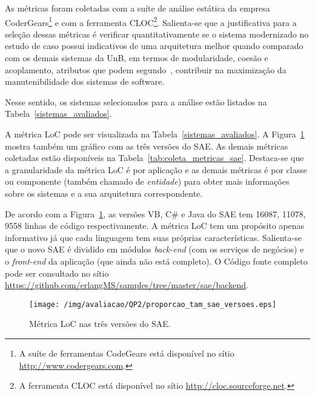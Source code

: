 As métricas foram coletadas com a suíte de análise estática da empresa CoderGears\footnote{A suíte de ferramentas CodeGears está disponível no sítio \url{http://www.codergears.com}.} e com a ferramenta CLOC\footnote{A ferramenta CLOC está disponível no sítio \url{http://cloc.sourceforge.net}.}. Salienta-se que a justificativa para a seleção dessas métricas é verificar quantitativamente se o sistema modernizado no estudo de caso possui indicativos
de uma arquitetura melhor quando comparado com os demais sistemas da UnB, em termos de modularidade, coesão e acoplamento, atributos que podem segundo~\cite{fenton2014software}, contribuir na maximização da manutenibilidade dos sistemas de software. 

Nesse sentido, os sistemas selecionados para a análise estão listados na Tabela~\ref{sistemas_avaliados}. 



 
A métrica LoC pode ser visualizada na Tabela~\ref{sistemas_avaliados}. A Figura~\ref{fig:proporcao_tam_sae_versoes} mostra também um gráfico com as três versões do \acrshort{SAE}. As demais métricas coletadas estão disponíveis na Tabela~\ref{tab:coleta_metricas_sae}. Destaca-se que a granularidade da métrica LoC é por aplicação e as demais métricas é por classe ou componente (também chamado de \emph{entidade}) para obter mais informações sobre os sistemas e a sua arquitetura correspondente.

De acordo com a Figura~\ref{fig:proporcao_tam_sae_versoes}, as versões VB, C\# e Java do \acrshort{SAE} tem 16087, 11078, 9558 linhas de código respectivamente. A métrica LoC tem um propósito apenas informativo já que cada linguagem tem suas próprias características. Salienta-se que o novo \acrshort{SAE} é dividido em módulos \textit{back-end} (com os serviços de negócios) e o \textit{front-end} da aplicação (que ainda não está completo). O Código fonte completo pode ser consultado no sítio \url{https://github.com/erlangMS/samples/tree/master/sae/backend}.



\begin{figure}[htb]
\centering
\texttt{[image: /img/avaliacao/QP2/proporcao\_tam\_sae\_versoes.eps]}
\caption{Métrica LoC nas três versões do SAE.}
\label{fig:proporcao_tam_sae_versoes}
\end{figure}


